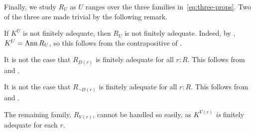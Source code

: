 \smallskip

Finally, we study $R_U$ as $U$ ranges over the three families in~\eqref{eq:three-props}.
Two of the three are made trivial by the following remark.

\begin{remark}\label{rem:ann-for-cex}
  If $K^U$ is not finitely adequate, then $R_U$ is not finitely adequate.
  Indeed, by , $K^U = \operatorname{Ann}{R_U}$, so this follows from
  the contrapositive of .
\end{remark}

\begin{counterexample}\label{cex:R_Dr-not-fin-adeq}
  It is not the case that $R_{D(r)}$ is finitely adequate for all $r : R$.
  This follows from  and .
\end{counterexample}

\begin{counterexample}\label{cex:R_not-Dr-not-fin-adeq}
  It is not the case that $R_{\lnot D(r)}$ is finitely adequate for all $r : R$.
  This follows from  and .
\end{counterexample}

The remaining family, $R_{V(r)}$, cannot be handled so easily, as $K^{V(r)}$
\emph{is} finitely adequate for each $r$.

